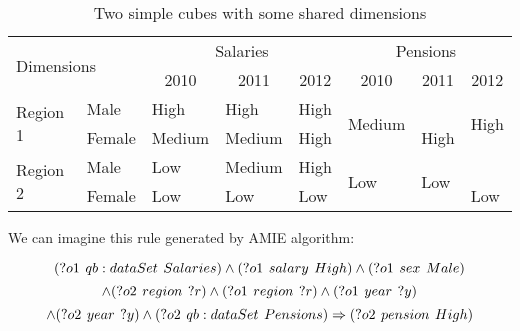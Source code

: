 \begin{table}[h]
\centering
\begin{tabular}{ll|lll|lll}
\multicolumn{2}{l|}{\multirow{2}{*}{Dimensions}} & \multicolumn{3}{c|}{Salaries}                                                   & \multicolumn{3}{c}{Pensions}                                                                                   \\
\multicolumn{2}{l|}{}                            & \multicolumn{1}{c}{2010} & \multicolumn{1}{c}{2011} & \multicolumn{1}{c|}{2012} & \multicolumn{1}{c}{2010} & \multicolumn{1}{c}{2011}                & \multicolumn{1}{c}{2012}                  \\ 
\hline
\multirow{2}{*}{Region 1} & Male                 & High                     & {\cellcolor{red}}High    & High                      & \multirow{2}{*}{Medium}  & {\cellcolor{red}}                       & \multirow{2}{*}{High}                     \\
                          & Female               & Medium                   & Medium                   & High                      &                          & \multirow{-2}{*}{{\cellcolor{red}}High} &                                           \\
\multirow{2}{*}{Region 2} & Male                 & Low                      & Medium                   & {\cellcolor{green}}High   & \multirow{2}{*}{Low}     & \multirow{2}{*}{Low}                    & {\cellcolor{green}}                       \\
                          & Female               & Low                      & Low                      & {\cellcolor{green}}Low    &                          &                                         & \multirow{-2}{*}{{\cellcolor{green}}Low} 
\end{tabular}
\caption{Two simple cubes with some shared dimensions}\label{table8}
\end{table} 

We can imagine this rule generated by AMIE algorithm:

$$
(?o1\hspace{0.4em}qb:dataSet\hspace{0.4em}Salaries) \land (?o1\hspace{0.4em}salary\hspace{0.4em}High) \land (?o1\hspace{0.4em}sex\hspace{0.4em}Male)  
$$
$$
\land (?o2\hspace{0.4em}region\hspace{0.4em}?r) \land (?o1\hspace{0.4em}region\hspace{0.4em}?r) \land (?o1\hspace{0.4em}year\hspace{0.4em}?y)
$$
$$
\land (?o2\hspace{0.4em}year\hspace{0.4em}?y) \land (?o2\hspace{0.4em}qb:dataSet\hspace{0.4em}Pensions) \Rightarrow (?o2\hspace{0.4em}pension\hspace{0.4em}High)
$$

